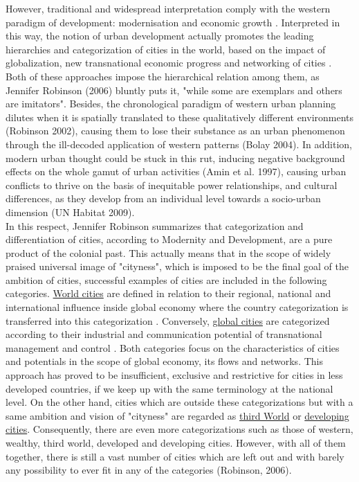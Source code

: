 \documentclass[11pt]{report}
\begin{document}
However, traditional and widespread interpretation comply with the western paradigm of development: modernisation and economic growth \href{ref}{\citealt{ref}}. Interpreted in this way, the notion of urban development actually promotes the leading hierarchies and categorization of cities in the world, based on the impact of globalization, new transnational  economic  progress  and  networking  of  cities \href{ref}{\citealt{ref}}. Both of these approaches impose the hierarchical relation among them, as Jennifer Robinson (2006) bluntly puts it, "while some are exemplars and others are imitators". Besides, the chronological paradigm of western urban planning dilutes when it is spatially translated to these qualitatively different environments (Robinson 2002), causing them to lose their substance as an urban phenomenon through the ill-decoded application of western patterns (Bolay 2004). In addition, modern urban thought could be stuck in this rut, inducing negative background effects on the whole gamut of urban activities (Amin et al. 1997), causing urban conflicts to thrive on the basis of inequitable power relationships, and cultural differences, as they develop from an individual level towards a socio-urban dimension (UN Habitat 2009).
\\
In  this  respect,  Jennifer  Robinson  summarizes  that  categorization  and  differentiation  of  cities, according to Modernity and Development, are a pure product of the colonial past. This actually means that in the scope of widely praised universal image of "cityness", which is imposed to be the final goal of the ambition of cities, successful examples of cities are included in the following categories. \underline{World cities} are defined in relation to their regional, national and international influence inside global economy where the country categorization is transferred into this categorization \href{ref}{\citealt{ref}}. Conversely, \underline{global cities} are categorized according to their industrial and communication potential of transnational management and control \href{ref}{\citealt{ref}}. Both categories focus on the characteristics of cities and potentials in the scope of global economy, its flows and networks. This approach has proved to be insufficient, exclusive and restrictive for cities in less developed countries, if we keep up with the same terminology at the national level. On the other hand, cities which are outside these categorizations but with a same ambition and vision of "cityness" are regarded as \underline{third World} or \underline{developing cities}. Consequently, there are even more categorizations such as those of western, wealthy, third world, developed and developing cities. However, with all of them together, there is still a vast number of cities which are left out and with barely any possibility to ever fit in any of the categories (Robinson, 2006). 
\end{document}
